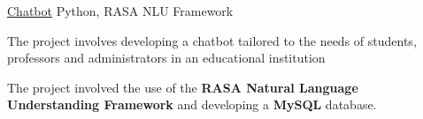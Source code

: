 \begin{cventries}
    

  \projects
    {} %
    {\href{https://github.com/software-community/almost-human}{Chatbot}} %
    {Python, RASA NLU Framework} %
    {} %
    {
      \begin{cvitems} %
        \item {The project involves developing a chatbot tailored to the needs of students, professors and administrators in an educational institution}
        \item {The project involved the use of the \textbf{RASA Natural Language Understanding Framework} and developing a \textbf{MySQL} database.}
      \end{cvitems}
    }

 


  


 


\end{cventries}

